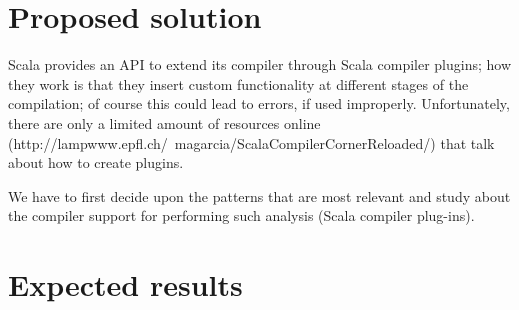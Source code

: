\documentclass{article}
\begin{document}
\section{Proposed solution}

Scala provides an API to extend its compiler through Scala compiler plugins; how they work is that they insert custom functionality at different stages of the compilation; of course this could lead to errors, if used improperly. Unfortunately, there are only a limited amount of resources online (http://lampwww.epfl.ch/~magarcia/ScalaCompilerCornerReloaded/) that talk about how to create plugins. \par
We have to first decide upon the patterns that are most relevant and study about the compiler support for performing such analysis (Scala compiler plug-ins). 

\section{Expected results}


\newpage


 

\end{document}
